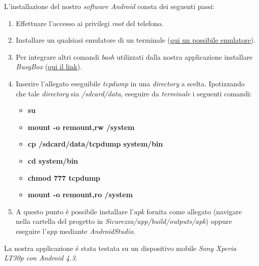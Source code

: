 \documentclass[12pt]{article} %
\begin{document}
\newpage %


L'installazione del nostro \textit{software Android} consta dei seguenti passi: 

\begin{enumerate}
\item Effettuare l'accesso ai privilegi \textit{root} del telefono.
\item Installare un qualsiasi emulatore di un terminale 
(\href{https://play.google.com/store/apps/details?id=jackpal.androidterm}{qui un possibile emulatore}).
\item Per integrare altri comandi \textit{bash} utilizzati dalla nostra applicazione installare \textit{BusyBox} 
(\href{https://play.google.com/store/apps/details?id=stericson.busybox&hl=it}{qui il link}). 
\item Inserire l'allegato eseguibile \textit{tcpdump} in una \textit{directory} a scelta. Ipotizzando che tale \textit{directory} sia \textit{/sdcard/data}, eseguire da \textit{terminale} i seguenti comandi:


\begin{itemize}

\item \textbf{su}
\item \textbf{mount -o remount,rw /system}
\item \textbf{cp /sdcard/data/tcpdump system/bin}
\item \textbf{cd system/bin}
\item \textbf{chmod 777 tcpdump}
\item \textbf{mount -o remount,ro /system}

\end{itemize}
  
\item A questo punto \'e possibile installare l'\textit{apk} fornita come allegato (navigare nella cartella del progetto in \textit{Sicurezza/app/build/outputs/apk}) oppure eseguire l'\textit{app} mediante \textit{AndroidStudio}.

\end{enumerate}

La nostra applicazione \'e stata testata su un dispositivo mobile \textit{Sony Xperia LT30p con Android 4.3}.
\end{document}
